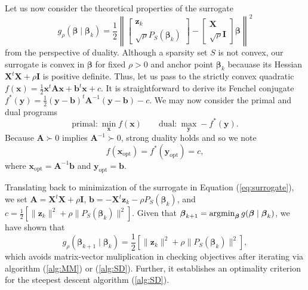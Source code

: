 \documentclass[11pt]{article}
\def\argmin{\mathop{\rm argmin}\nolimits}
\newcommand{\bb}{\boldsymbol{b}}
\newcommand{\bx}{\boldsymbol{x}}
\newcommand{\by}{\boldsymbol{y}}
\newcommand{\bz}{\boldsymbol{z}}
\newcommand{\bA}{\boldsymbol{A}}
\newcommand{\bI}{\boldsymbol{I}}
\newcommand{\bX}{\boldsymbol{X}}
\newcommand{\bbeta}{\boldsymbol{\beta}}
\begin{document}
Let us now consider the theoretical properties of the surrogate
\begin{equation}
    \label{eq:surrogate}
    g_{\rho}(\bbeta \mid \bbeta_{k})
    =
    \frac{1}{2} \left\|
        \begin{bmatrix}
            \bz_{k} \\ \sqrt{\rho} P_{S}(\bbeta_{k})
        \end{bmatrix}
        -
        \begin{bmatrix}
            \bX \\ \sqrt{\rho} \bI
        \end{bmatrix}
        \bbeta
    \right\|^{2}
\end{equation}
from the perspective of duality.
Although a sparsity set $S$ is not convex, our surrogate is convex in $\bbeta$ for fixed $\rho > 0$ and anchor point $\bbeta_{k}$ becauase its Hessian $\bX^{t}\bX + \rho \bI$ is positive definite.
Thus, let us pass to the strictly convex quadratic $f(\bx) = \frac{1}{2} \bx^{t} \bA \bx + \bb^{t} \bx + c$.
It is straightforward to derive its Fenchel conjugate $f^{\ast}(\by) = \frac{1}{2} (\by - \bb)^{t} \bA^{-1} (\by - \bb) - c$.
We may now consider the primal and dual programs
\[
    \text{primal:}~\min_{\bx} f(\bx)
    \qquad
    \text{dual:}~\max_{\by} -f^{\ast}(\by).
\]
Because $\bA \succ 0$ implies $\bA^{-1} \succ 0$, strong duality holds and so we note
\[
    f(\bx_{\mathrm{opt}}) = f^{\ast}(\by_{\mathrm{opt}}) = c,
\]
where $\bx_{\mathrm{opt}} = \bA^{-1} \bb$ and $\by_{\mathrm{opt}} = \bb$.

Translating back to minimization of the surrogate in Equation (\ref{eq:surrogate}), we set $\bA = \bX^{t} \bX + \rho \bI$, $\bb = -\bX^{t} \bz_{k} - \rho P_{S}(\bbeta_{k})$, and $c = \frac{1}{2}[\|\bz_{k}\|^{2} + \rho \|P_{S}(\bbeta_{k})\|^{2}]$.
Given that $\bbeta_{k+1} = \argmin_{\bbeta} g(\bbeta \mid \bbeta_{k})$, we have shown that
\[
    g_{\rho}(\bbeta_{k+1} \mid \bbeta_{k})
    =
    \frac{1}{2}[\|\bz_{k}\|^{2} + \rho \|P_{S}(\bbeta_{k})\|^{2}],
\]
which avoids matrix-vector muliplication in checking objectives after iterating via algorithm (\ref{alg:MM}) or (\ref{alg:SD}).
Further, it establishes an optimality criterion for the steepest descent algorithm (\ref{alg:SD}).
\end{document}
